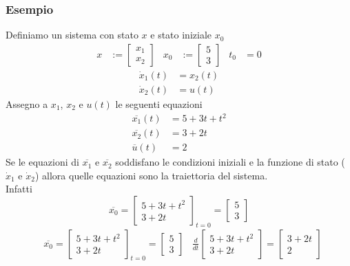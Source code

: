 \documentclass{article}
\numberwithin{equation}{subsection}
\begin{document}
\subsubsection{Esempio}
Definiamo un sistema con stato $x$ e stato iniziale $x_0$
\begin{align*}
    x &:=
    \begin{bmatrix}
        x_1\\
        x_2
    \end{bmatrix}
    &
    x_0 &:=
    \begin{bmatrix}
        5\\
        3
    \end{bmatrix}
    &
    t_0 &= 0
\end{align*}
\begin{align*}
    \dot x_1(t) &= x_2(t)\\
    \dot x_2(t) &= u(t)
\end{align*}
Assegno a $x_1$, $x_2$ e $u(t)$ le seguenti equazioni
\begin{align*}
    \overline{x_1}(t) &= 5+3t+t^2\\
    \overline{x_2}(t) &= 3+2t\\
    \overline{u}(t) &= 2
\end{align*}
Se le equazioni di $\overline{x_1}$ e $\overline{x_2}$ soddisfano le condizioni iniziali e la funzione di stato ($\dot x_1$ e $\dot x_2$) allora quelle equazioni sono la traiettoria del sistema.\\
Infatti
\begin{equation}
    \overline{x_0} = 
    \begin{bmatrix}
        5+3t+t^2\\
        3+2t
    \end{bmatrix}_{t=0} 
    =
    \begin{bmatrix}
        5\\
        3
    \end{bmatrix}
\end{equation}
\begin{align*}
    &\overline{x_0} = 
    \begin{bmatrix}
        5+3t+t^2\\
        3+2t
    \end{bmatrix}_{t=0} 
    =
    \begin{bmatrix}
        5\\
        3
    \end{bmatrix}
    &
    \frac{d}{dt} 
    \begin{bmatrix}
        5+3t+t^2\\
        3+2t
    \end{bmatrix}
    =
    \begin{bmatrix}
        3+2t\\
        2
    \end{bmatrix}
\end{align*}
\end{document}

